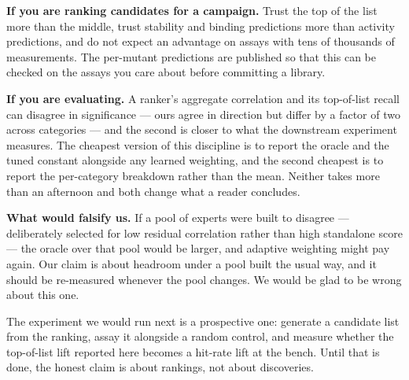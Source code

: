 \textbf{If you are ranking candidates for a campaign.} Trust the top of the list more than the middle, trust
stability and binding predictions more than activity predictions, and do not expect an advantage on
assays with tens of thousands of measurements. The per-mutant predictions are published so that this can
be checked on the assays you care about before committing a library.

\textbf{If you are evaluating.} A ranker's aggregate correlation and its top-of-list recall can disagree in
significance --- ours agree in direction but differ by a factor of two across categories --- and the second
is closer to what the downstream experiment measures. The cheapest version of this discipline is to
report the oracle and the tuned constant alongside any learned weighting, and the second cheapest is to
report the per-category breakdown rather than the mean. Neither takes more than an afternoon and both
change what a reader concludes.

\textbf{What would falsify us.} If a pool of experts were built to disagree --- deliberately selected for low
residual correlation rather than high standalone score --- the oracle over that pool would be larger, and
adaptive weighting might pay again. Our claim is about headroom under a pool built the usual way, and it
should be re-measured whenever the pool changes. We would be glad to be wrong about this one.

The experiment we would run next is a prospective one: generate a candidate list from the ranking, assay
it alongside a random control, and measure whether the top-of-list lift reported here becomes a hit-rate
lift at the bench. Until that is done, the honest claim is about rankings, not about discoveries.
